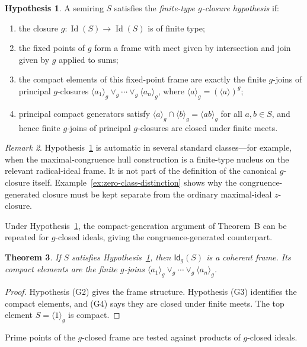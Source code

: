 \documentclass[11pt,leqno]{amsart}
\theoremstyle{plain}
\newtheorem{theorem}{Theorem}[section]
\theoremstyle{definition}
\newtheorem{hypothesis}[theorem]{Hypothesis}
\theoremstyle{remark}
\newtheorem{remark}[theorem]{Remark}
\numberwithin{equation}{section}
\DeclareMathOperator{\Id}{Id}
\newcommand{\GCl}{\mathsf{Id}_{g}}
\newcommand{\ideal}[1]{\langle #1\rangle}
\begin{document}
\begin{hypothesis}\label{hyp:g-closure}
A semiring $S$ satisfies the \emph{finite-type $g$-closure
hypothesis} if:
\begin{enumerate}[label=\upshape(G\arabic*)]
\item the closure $g:\Id(S)\to\Id(S)$ is of finite type;
\item the fixed points of $g$ form a frame with meet given by
  intersection and join given by $g$ applied to sums;
\item the compact elements of this fixed-point frame are exactly
  the finite $g$-joins of principal $g$-closures
  $\ideal{a_1}_g\vee_g\cdots\vee_g\ideal{a_n}_g$,
  where $\ideal{a}_g=(\ideal{a})^g$;
\item principal compact generators satisfy
  $\ideal{a}_g\cap\ideal{b}_g=\ideal{ab}_g$ for all $a,b\in S$,
  and hence finite $g$-joins of principal $g$-closures are closed
  under finite meets.
\end{enumerate}
\end{hypothesis}

\begin{remark}
Hypothesis~\ref{hyp:g-closure} is automatic in several standard
classes---for example, when the maximal-congruence hull construction
is a finite-type nucleus on the relevant radical-ideal frame.
It is not part of the definition of the canonical $g$-closure itself.
Example~\ref{ex:zero-class-distinction} shows why the
congruence-generated closure must be kept separate from the
ordinary maximal-ideal $z$-closure.
\end{remark}

Under Hypothesis~\ref{hyp:g-closure}, the compact-generation
argument of Theorem~B can be repeated for $g$-closed ideals,
giving the congruence-generated counterpart.

\begin{theorem}\label{GCl-coherent-frame}
If $S$ satisfies Hypothesis~\ref{hyp:g-closure}, then $\GCl(S)$
is a coherent frame.
Its compact elements are the finite $g$-joins
$\ideal{a_1}_g\vee_g\cdots\vee_g\ideal{a_n}_g$.
\end{theorem}
\begin{proof}
Hypothesis (G2) gives the frame structure.
Hypothesis (G3) identifies the compact elements,
and (G4) says they are closed under finite meets.
The top element $S=\ideal{1}_g$ is compact.
\end{proof}

Prime points of the $g$-closed frame are tested against products
of $g$-closed ideals.
\end{document}
